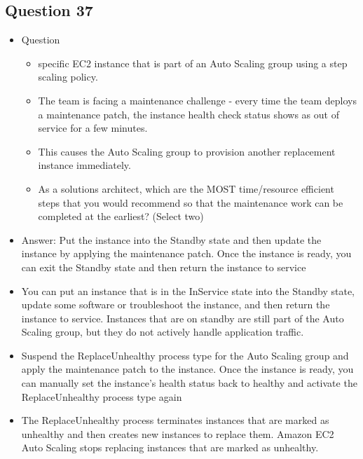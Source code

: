 \documentclass[]{scrartcl}
\begin{document}
\subsection{Question 37}
\begin{itemize}
	\item Question
	\begin{itemize}
		\item specific EC2 instance that is part of an Auto Scaling group using a step scaling policy. 
		\item The team is facing a maintenance challenge - every time the team deploys a maintenance patch, the instance health check status shows as out of service for a few minutes.
		\item This causes the Auto Scaling group to provision another replacement instance immediately.
		\item As a solutions architect, which are the MOST time/resource efficient steps that you would recommend so that the maintenance work can be completed at the earliest? (Select two)
	\end{itemize}
	\item Answer: Put the instance into the Standby state and then update the instance by applying the maintenance patch. Once the instance is ready, you can exit the Standby state and then return the instance to service
	\item You can put an instance that is in the InService state into the Standby state, update some software or troubleshoot the instance, and then return the instance to service. Instances that are on standby are still part of the Auto Scaling group, but they do not actively handle application traffic.
	\item Suspend the ReplaceUnhealthy process type for the Auto Scaling group and apply the maintenance patch to the instance. Once the instance is ready, you can manually set the instance's health status back to healthy and activate the ReplaceUnhealthy process type again
	\item The ReplaceUnhealthy process terminates instances that are marked as unhealthy and then creates new instances to replace them. Amazon EC2 Auto Scaling stops replacing instances that are marked as unhealthy.
\end{itemize}
\end{document}
